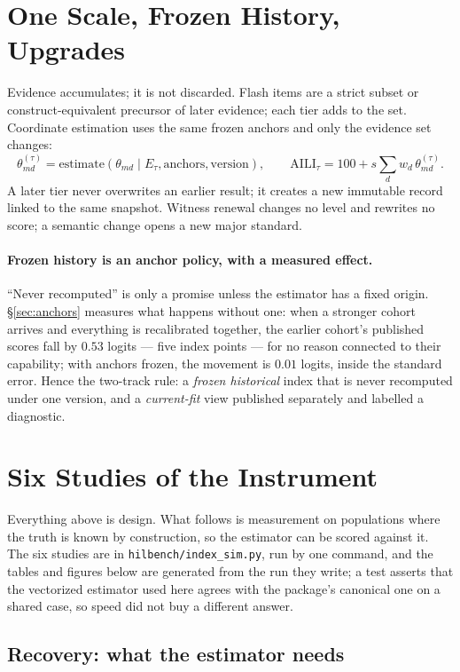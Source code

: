 \documentclass[11pt]{article}
\theoremstyle{definition}
\begin{document}
\section{One Scale, Frozen History, Upgrades}\label{sec:history}

Evidence accumulates; it is not discarded. Flash items are a strict subset or construct-equivalent precursor of later evidence; each tier adds to the set. Coordinate estimation uses the same frozen anchors and only the evidence set changes:
\[
\theta^{(\tau)}_{md} = \text{estimate}(\theta_{md} \mid E_\tau, \text{anchors}, \text{version}), \qquad
\mathrm{AILI}_\tau = 100 + s \sum_d w_d\,\theta^{(\tau)}_{md}.
\]
A later tier never overwrites an earlier result; it creates a new immutable record linked to the same snapshot. Witness renewal changes no level and rewrites no score; a semantic change opens a new major standard.

\paragraph{Frozen history is an anchor policy, with a measured effect.} ``Never recomputed'' is only a promise unless the estimator has a fixed origin. \S\ref{sec:anchors} measures what happens without one: when a stronger cohort arrives and everything is recalibrated together, the earlier cohort's published scores fall by $0.53$ logits --- five index points --- for no reason connected to their capability; with anchors frozen, the movement is $0.01$ logits, inside the standard error. Hence the two-track rule: a \emph{frozen historical} index that is never recomputed under one version, and a \emph{current-fit} view published separately and labelled a diagnostic.

\section{Six Studies of the Instrument}\label{sec:studies}

Everything above is design. What follows is measurement on populations where the truth is known by construction, so the estimator can be scored against it. The six studies are in \texttt{hilbench/index\_sim.py}, run by one command, and the tables and figures below are generated from the run they write; a test asserts that the vectorized estimator used here agrees with the package's canonical one on a shared case, so speed did not buy a different answer.

\subsection{Recovery: what the estimator needs}\label{sec:recovery}
\end{document}
